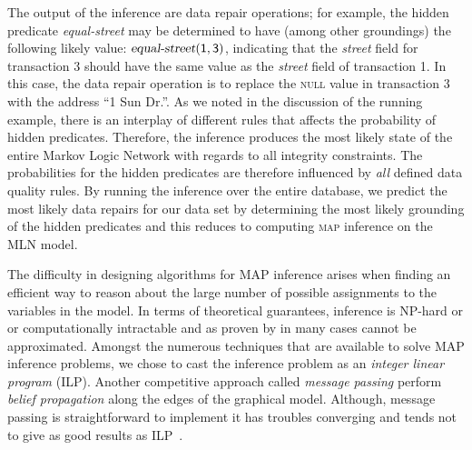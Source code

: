 The output of the inference are data repair operations; for example, the hidden predicate \textsl{equal-street} may be determined to have (among other groundings) the following likely value: $\mathsf{\textsl{equal-street}(1, 3)}$, indicating that the \textsl{street} field for transaction 3 should have the same value as the \textsl{street} field of transaction 1. In this case, the data repair operation is to replace the \textsc{null} value in transaction 3 with the address ``1 Sun Dr.''. 
As we noted in the discussion of the running example, there is an interplay of different rules that affects the probability of hidden predicates. Therefore, the inference produces the most likely state of the entire Markov Logic Network with regards to all integrity constraints. The probabilities for the hidden predicates are therefore influenced by \textit{all} defined data quality rules. By running the inference over the entire database, we predict the most likely data repairs for our data set by determining the most likely grounding of the hidden predicates and this reduces to computing \textsc{map} inference on the MLN model.      

The difficulty in designing algorithms for MAP inference arises when finding an efficient way to reason about the large number of possible assignments to the variables in the model. In terms of theoretical guarantees, inference is NP-hard or or computationally intractable and as proven by \cite{Shimony1994} in many cases cannot be approximated. Amongst the numerous techniques that are available to solve MAP inference problems, we chose to cast the inference problem as an \emph{integer linear program} (ILP)\cite{Sontag10approximateinference}. Another competitive approach called \emph{message passing} perform \emph{belief propagation} along the edges of the graphical model. Although, message passing is straightforward to implement it has troubles converging \cite{schwing2011distributed, felzenszwalb2006efficient, pritch2009shift} and tends not to give as good results as ILP~\cite{NoessnerNS13}. 

